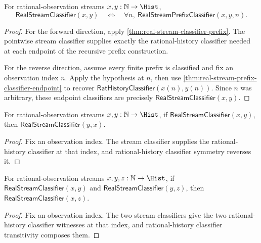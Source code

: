 \begin{theorem}
\label{thm:real-stream-finite-prefix-exactness}
For rational-observation streams $x,y:\mathbb{N}\to\Hist$,
$$
\mathsf{RealStreamClassifier}(x,y)
\quad\Longleftrightarrow\quad
\forall n,\ \mathsf{RealStreamPrefixClassifier}(x,y,n).
$$
\end{theorem}
\begin{proof}
For the forward direction, apply
\autoref{thm:real-stream-classifier-prefix}. The pointwise stream classifier
supplies exactly the rational-history classifier needed at each endpoint of the
recursive prefix construction.

For the reverse direction, assume every finite prefix is classified and fix an
observation index $n$. Apply the hypothesis at $n$, then use
\autoref{thm:real-stream-prefix-classifier-endpoint} to recover
$\mathsf{RatHistoryClassifier}(x(n),y(n))$. Since $n$ was arbitrary, these
endpoint classifiers are precisely $\mathsf{RealStreamClassifier}(x,y)$.
\end{proof}

\begin{theorem}
\label{thm:real-stream-classifier-symmetry}
For rational-observation streams $x,y:\mathbb{N}\to\Hist$, if
$\mathsf{RealStreamClassifier}(x,y)$, then
$\mathsf{RealStreamClassifier}(y,x)$.
\end{theorem}
\begin{proof}
Fix an observation index. The stream classifier supplies the rational-history
classifier at that index, and rational-history classifier symmetry reverses it.
\end{proof}

\begin{theorem}
\label{thm:real-stream-classifier-transitivity}
For rational-observation streams $x,y,z:\mathbb{N}\to\Hist$, if
$\mathsf{RealStreamClassifier}(x,y)$ and
$\mathsf{RealStreamClassifier}(y,z)$, then
$\mathsf{RealStreamClassifier}(x,z)$.
\end{theorem}
\begin{proof}
Fix an observation index. The two stream classifiers give the two
rational-history classifier witnesses at that index, and rational-history
classifier transitivity composes them.
\end{proof}

